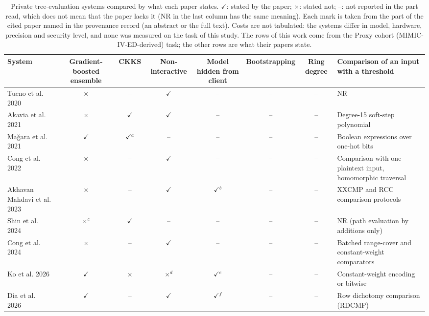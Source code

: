 \begin{table}[t]
\centering
\caption{Private tree-evaluation systems compared by what each paper states. $\checkmark$: stated by the paper; $\times$: stated not; --: not reported in the part read, which does not mean that the paper lacks it (NR in the last column has the same meaning). Each mark is taken from the part of the cited paper named in the provenance record (an abstract or the full text). Costs are not tabulated: the systems differ in model, hardware, precision and security level, and none was measured on the task of this study. The rows of this work come from the Proxy cohort (MIMIC-IV-ED-derived) task; the other rows are what their papers state.}
\label{tab:t16_tree_systems}
\footnotesize
\begin{tabular}{>{\raggedright\arraybackslash}p{3.4cm}cccccc>{\raggedright\arraybackslash}p{4.4cm}}
\toprule
System & Gradient-boosted ensemble & CKKS & Non-interactive & Model hidden from client & Boot\-strapping & Ring degree & Comparison of an input with a threshold \\
\midrule
Tueno et al. 2020~\cite{tueno2020noninteractive} & $\times$ & -- & $\checkmark$ & -- & -- & -- & NR \\
Akavia et al. 2021~\cite{akavia2021ppdt} & $\times$ & $\checkmark$ & $\checkmark$ & -- & -- & -- & Degree-15 soft-step polynomial \\
Mağara et al. 2021~\cite{magara2021mlhe} & $\checkmark$ & $\checkmark$$^{a}$ & -- & -- & -- & -- & Boolean expressions over one-hot bits \\
Cong et al. 2022~\cite{cong2022sortinghat} & $\times$ & -- & $\checkmark$ & -- & -- & -- & Comparison with one plaintext input, homomorphic traversal \\
Akhavan Mahdavi et al. 2023~\cite{mahdavi2023levelup} & $\times$ & -- & $\checkmark$ & $\checkmark$$^{b}$ & -- & -- & XXCMP and RCC comparison protocols \\
Shin et al. 2024~\cite{shin2024hbdt} & $\times$$^{c}$ & $\checkmark$ & -- & -- & -- & -- & NR (path evaluation by additions only) \\
Cong et al. 2024~\cite{cong2024faster} & $\times$ & -- & $\checkmark$ & -- & -- & -- & Batched range-cover and constant-weight comparators \\
Ko et al. 2026~\cite{ko2024silentwood} & $\checkmark$ & $\times$ & $\times$$^{d}$ & $\checkmark$$^{e}$ & -- & -- & Constant-weight encoding or bitwise \\
Dia et al. 2026~\cite{dia2026strawhat} & $\checkmark$ & -- & $\checkmark$ & $\checkmark$$^{f}$ & -- & -- & Row dichotomy comparison (RDCMP) \\

\end{tabular}
\end{table}
